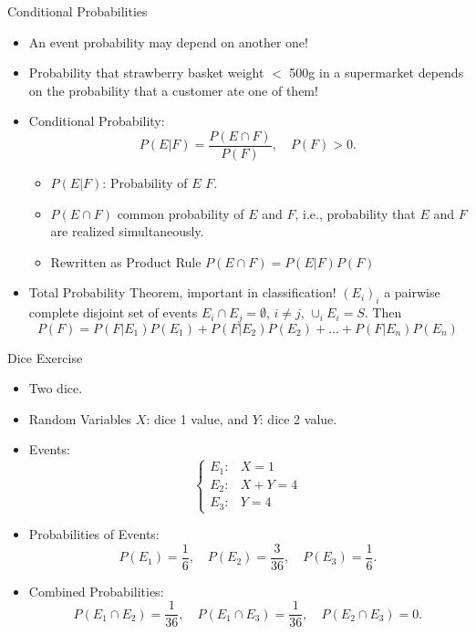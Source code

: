 \documentclass[9pt]{beamer}
\newcommand{\myemph}[1]{{\color{blue}{#1}}}
\begin{document}
\begin{frame}[t]{Conditional Probabilities}

  \begin{itemize}
  \item An event probability may depend on another one!
  \item Probability that strawberry basket weight $<$ 500g in a supermarket depends on the probability that a customer ate one of them!
  \item Conditional Probability:
    $$
    P(E|F) = \frac{P(E\cap F)}{P(F)},\quad P(F)> 0.
    $$
    \pause
    \begin{itemize}[<+->]
    \item $P(E|F)$: Probability of $E$ \myemph{knowing} $F$.\vfill
    \item $P(E\cap F)$ common probability of $E$ and $F$, i.e., probability that $E$ and
      $F$ are realized simultaneously.\vfill
    \item Rewritten as Product Rule $P(E\cap F) =P(E|F) P(F)$
    \end{itemize}\pause
    \vfill
    \item Total Probability Theorem, important in classification! $(E_i)_i$ a pairwise complete disjoint set of events
      $
      E_i\cap E_j = \emptyset$, $i\not=j$, $\cup_i E_i = S$.
      Then 
      $$
      P(F) = P(F|E_1)P(E_1) + P(F|E_2)P(E_2) + \dots +  P(F|E_n)P(E_n)
      $$
  \end{itemize}
\end{frame}



\begin{frame}[t]{Dice Exercise}
  \begin{itemize}
  \item Two dice.
  \item Random Variables $X$: dice 1 value, and $Y$: dice 2 value.
  \item Events: 
    $$
    \begin{cases}
      E_1: & X = 1\\
      E_2: & X + Y = 4\\
      E_3: & Y = 4 
    \end{cases}
    $$
  \item Probabilities of Events:
    $$
    P(E_1) = \frac{1}{6},\quad P(E_2)= \frac3{36},\quad P(E_3) = \frac{1}{6}. 
    $$
  \item Combined Probabilities:
    $$
    P(E_1\cap E_2) =\frac1{36},\quad P(E_1\cap E_3) = \frac{1}{36}, \quad P(E_2\cap E_3) = 0.
    $$
  \end{itemize}
\end{frame}
\end{document}

